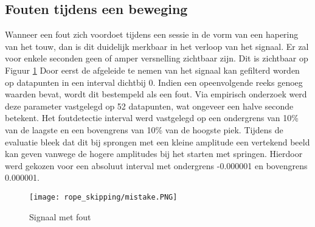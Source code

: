 \subsection{Fouten tijdens een beweging}
Wanneer een fout zich voordoet tijdens een sessie in de vorm van een hapering van het touw, dan is dit duidelijk merkbaar in het verloop van het signaal. Er zal voor enkele seconden geen of amper versnelling zichtbaar zijn. Dit is zichtbaar op Figuur \ref{fig:mistake} Door eerst de afgeleide te nemen van het signaal kan gefilterd worden op datapunten in een interval dichtbij 0. Indien een opeenvolgende reeks genoeg waarden bevat, wordt dit bestempeld als een fout. Via empirisch onderzoek werd deze parameter vastgelegd op 52 datapunten, wat ongeveer een halve seconde betekent. Het foutdetectie interval werd vastgelegd op een ondergrens van 10\% van de laagste en een bovengrens van 10\% van de hoogste piek. Tijdens de evaluatie bleek dat dit bij sprongen met een kleine amplitude een vertekend beeld kan geven vanwege de hogere amplitudes bij het starten met springen. Hierdoor werd gekozen voor een absoluut interval met ondergrens -0.000001 en bovengrens 0.000001.

\begin{figure}[!htpd]
\centering
\caption{Signaal met fout}\label{fig:mistake}
\texttt{[image: rope\_skipping/mistake.PNG]} 
\end{figure}